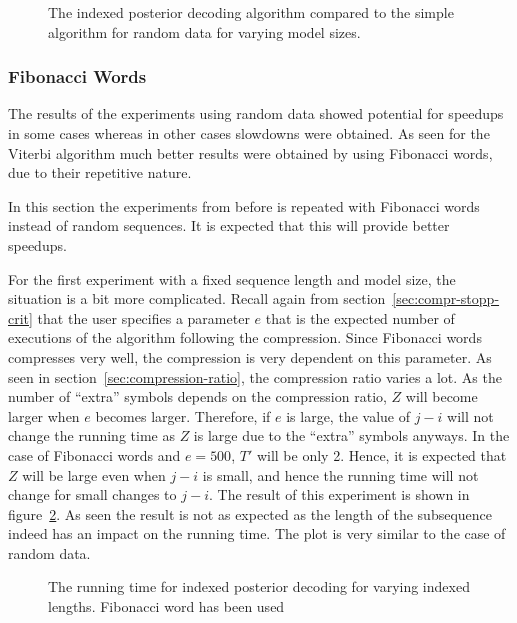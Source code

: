 \begin{figure}
  \centering
  
  \caption{The indexed posterior decoding algorithm compared to the simple
    algorithm for random data for varying model sizes.}
  \label{fig:indexed_posterior_speedup_vs_N}
\end{figure}

\subsubsection{Fibonacci Words}

The results of the experiments using random data showed potential for speedups
in some cases whereas in other cases slowdowns were obtained. As seen for the
Viterbi algorithm much better results were obtained by using Fibonacci words,
due to their repetitive nature.

In this section the experiments from before is repeated with Fibonacci words
instead of random sequences. It is expected that this will provide better
speedups.

For the first experiment with a fixed sequence length and model size, the
situation is a bit more complicated. Recall again from
section~\ref{sec:compr-stopp-crit} that the user specifies a parameter $e$ that
is the expected number of executions of the algorithm following the
compression. Since Fibonacci words compresses very well, the compression is very
dependent on this parameter. As seen in section~\ref{sec:compression-ratio},
the compression ratio varies a lot.  As the number of
``extra'' symbols depends on the compression ratio, $Z$ will become larger when
$e$ becomes larger. Therefore, if $e$ is large, the value of $j - i$ will not
change the running time as $Z$ is large due to the ``extra'' symbols anyways.
In the case of Fibonacci words and $e = 500$, $T'$ will be only 2. Hence, it is
expected that $Z$ will be large even when $j - i$ is small, and hence the
running time will not change for small changes to $j - i$. The result of this
experiment is shown in
figure~\ref{fig:assymptotic_indexed_posterior_fib_subseq_length.tex}. As seen
the result is not as expected as the length of the subsequence indeed has an
impact on the running time. The plot is very similar to the case of random
data. 

\begin{figure}
  \centering
  
  \caption{The running time for indexed posterior decoding for
    varying indexed lengths. Fibonacci word has been used}
  \label{fig:assymptotic_indexed_posterior_fib_subseq_length.tex}
\end{figure}


